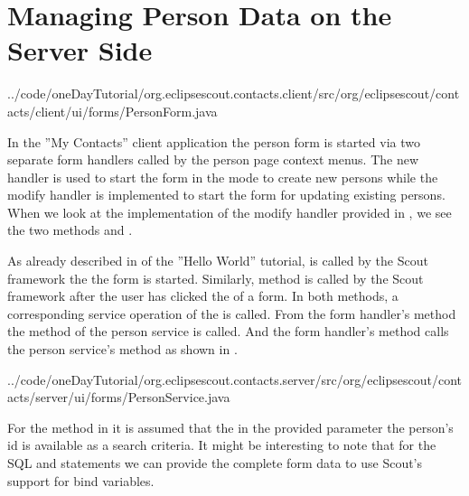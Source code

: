 \documentclass[a4paper,10pt,twoside]{book}
\begin{document}
\section{Managing Person Data on the Server Side}


{../code/oneDayTutorial/org.eclipsescout.contacts.client/src/org/eclipsescout/contacts/client/ui/forms/PersonForm.java}

In the ''My Contacts'' client application the person form is started via two separate form handlers called by the person page context menus. 
The new handler is used to start the form in the mode to create new persons while the modify handler is implemented to start the form for updating existing persons. 
When we look at the implementation of the modify handler provided in , we see the two methods  and . 

As already described in  of the ''Hello World'' tutorial,  is called by the Scout framework the the form is started. 
Similarly, method  is called by the Scout framework after the user has clicked the  of a form. 
In both methods, a corresponding service operation of the  is called. 
From the form handler's  method the method  of the person service is called. 
And the form handler's  method calls the person service's method  as shown in . 


{../code/oneDayTutorial/org.eclipsescout.contacts.server/src/org/eclipsescout/contacts/server/ui/forms/PersonService.java}

For the  method in  it is assumed that the in the provided parameter  the person's id is available as a search criteria. 
It might be interesting to note that for the SQL  and  statements we can provide the complete form data to use Scout's support for bind variables. 
\end{document}
